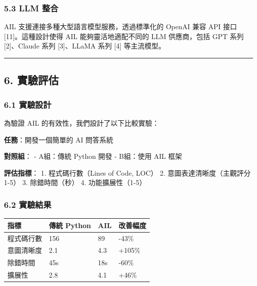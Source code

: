 \subsubsection{5.3 LLM 整合}\label{llm-ux6574ux5408}

AIL 支援連接多種大型語言模型服務，透過標準化的 OpenAI 兼容 API 接口
{[}11{]}。這種設計使得 AIL 能夠靈活地適配不同的 LLM 供應商，包括 GPT
系列 {[}2{]}、Claude 系列 {[}3{]}、LLaMA 系列 {[}4{]} 等主流模型。

\begin{Shaded}
\begin{Highlighting}[]
\OperatorTok{=}\OperatorTok{=}\NormalTok{)}

\OperatorTok{=} \NormalTok{)}
\end{Highlighting}
\end{Shaded}

\begin{center}\rule{0.5\linewidth}{0.5pt}\end{center}

\subsection{6. 實驗評估}\label{ux5be6ux9a57ux8a55ux4f30}

\subsubsection{6.1 實驗設計}\label{ux5be6ux9a57ux8a2dux8a08}

為驗證 AIL 的有效性，我們設計了以下比較實驗：

\textbf{任務}：開發一個簡單的 AI 問答系統

\textbf{對照組}： - A組：傳統 Python 開發 - B組：使用 AIL 框架

\textbf{評估指標}： 1. 程式碼行數（Lines of Code, LOC） 2.
意圖表達清晰度（主觀評分 1-5） 3. 除錯時間（秒） 4. 功能擴展性（1-5）

\subsubsection{6.2 實驗結果}\label{ux5be6ux9a57ux7d50ux679c}

{\def\LTcaptype{none} %
\begin{longtable}[]{@{}llll@{}}
\toprule\noalign{}
指標 & 傳統 Python & AIL & 改善幅度 \\
\midrule\noalign{}
\endhead
\bottomrule\noalign{}
\endlastfoot
程式碼行數 & 156 & 89 & -43\% \\
意圖清晰度 & 2.1 & 4.3 & +105\% \\
除錯時間 & 45s & 18s & -60\% \\
擴展性 & 2.8 & 4.1 & +46\% \\
\end{longtable}
}

